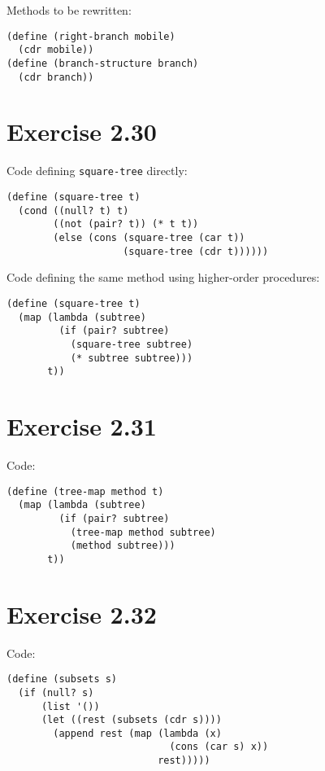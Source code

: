 \documentclass[../main.tex]{subfiles}
\begin{document}
Methods to be rewritten:

\begin{lstlisting}
(define (right-branch mobile)
  (cdr mobile))
(define (branch-structure branch)
  (cdr branch))
\end{lstlisting}

\section{Exercise 2.30}

Code defining \lstinline{square-tree} directly:

\begin{lstlisting}
(define (square-tree t)
  (cond ((null? t) t)
        ((not (pair? t)) (* t t))
        (else (cons (square-tree (car t))
                    (square-tree (cdr t))))))
\end{lstlisting}

Code defining the same method using higher-order
 procedures:
 
\begin{lstlisting}
(define (square-tree t)
  (map (lambda (subtree)
         (if (pair? subtree)
           (square-tree subtree)
           (* subtree subtree)))
       t))
\end{lstlisting}

\section{Exercise 2.31}

Code:

\begin{lstlisting}
(define (tree-map method t)
  (map (lambda (subtree)
         (if (pair? subtree)
           (tree-map method subtree)
           (method subtree)))
       t))
\end{lstlisting}

\section{Exercise 2.32}

Code:

\begin{lstlisting}
(define (subsets s)
  (if (null? s)
      (list '())
      (let ((rest (subsets (cdr s))))
        (append rest (map (lambda (x)
                            (cons (car s) x))
                          rest)))))
\end{lstlisting}
\end{document}
